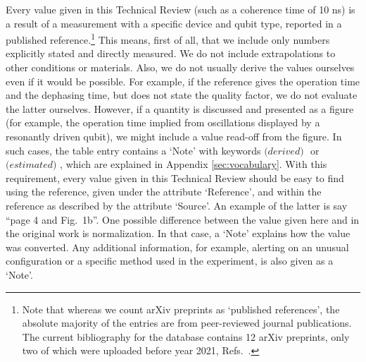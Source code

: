 \documentclass[aps, prx, showpacs, twocolumn, superscriptaddress, notitlepage, longbibliography, floatfix, nofootinbib]{revtex4-2}
\newcommand{\estimated}{\textit{(estimated) }}
\newcommand{\derived}{\textit{(derived) }}
\newcommand{\myKey}[1]{$\whitearrowupfrombar$\textit{#1}}
\renewcommand{\myKey}[1]{\textit{#1}}
\renewcommand{\myKey}[1]{`{#1}'}
\newcommand{\recheck}[1]{{#1}}
\begin{document}
Every value given in this Technical Review (such as a coherence time of 10 ns) is a result of a measurement with a specific device and qubit type, reported in a published reference.\footnote{\recheck{Note that whereas we count arXiv preprints as `published references', the absolute majority of the entries are from peer-reviewed journal publications. The current bibliography for the database contains 12 arXiv preprints, only two of which were uploaded before year 2021, Refs.~\cite{hayes_lifetime_2009,cerfontaine_feedback-tuned_2016}.}} This means, first of all, that we include only numbers explicitly stated and directly measured. We do not include extrapolations to other conditions or materials. Also, we do not usually derive the values ourselves even if it would be possible. For example, if the reference gives the operation time and the dephasing time, but does not state the quality factor, we do not evaluate the latter ourselves. However, if a quantity is discussed and presented as a figure (for example, the operation time implied from oscillations displayed by a resonantly driven qubit), we might include a value read-off from the figure. In such cases, the table entry contains a \myKey{Note} with keywords $\derived$\! or $\estimated$\!, which are explained in Appendix \ref{sec:vocabulary}. With this requirement, every value given in this Technical Review should be easy to find using the reference, given under the attribute \myKey{Reference}, and within the reference as described by the attribute \myKey{Source}. An example of the latter is say ``page 4 and Fig.~1b''. One possible difference between the value given here and in the original work is normalization. In that case, a \myKey{Note} explains how the value was converted. Any additional information, for example, alerting on an unusual configuration or a specific method used in the experiment, is also given as a \myKey{Note}. 
\end{document}
